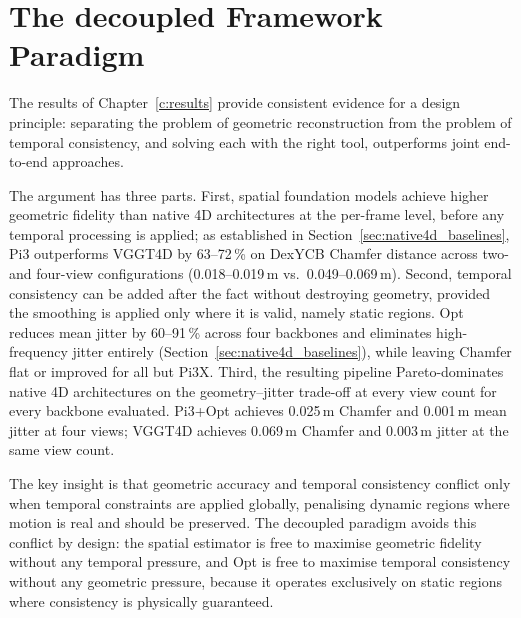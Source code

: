 \section{The decoupled Framework Paradigm}
\label{sec:decoupled_paradigm}

The results of Chapter~\ref{c:results} provide consistent evidence for a design
principle: separating the problem of geometric reconstruction from the problem of
temporal consistency, and solving each with the right tool, outperforms joint
end-to-end approaches.

The argument has three parts. First, spatial foundation models achieve higher geometric
fidelity than native 4D architectures at the per-frame level, before any temporal
processing is applied; as established in Section~\ref{sec:native4d_baselines}, Pi3
outperforms VGGT4D by 63--72\,\% on DexYCB Chamfer distance across two- and four-view
configurations (0.018--0.019\,m vs.\ 0.049--0.069\,m). Second, temporal consistency can be added after the
fact without destroying geometry, provided the smoothing is applied only where it is
valid, namely static regions. Opt reduces mean jitter by 60--91\,\% across four backbones and eliminates
high-frequency jitter entirely (Section~\ref{sec:native4d_baselines}), while leaving
Chamfer flat or improved for all but Pi3X. Third, the
resulting pipeline Pareto-dominates native 4D architectures on the geometry--jitter
trade-off at every view count for every backbone evaluated. Pi3+Opt achieves 0.025\,m
Chamfer and 0.001\,m mean jitter at four views; VGGT4D achieves 0.069\,m Chamfer and
0.003\,m jitter at the same view count.

The key insight is that geometric accuracy and temporal consistency conflict only when
temporal constraints are applied globally, penalising dynamic regions where motion is
real and should be preserved. The decoupled paradigm avoids this conflict by design:
the spatial estimator is free to maximise geometric fidelity without any temporal
pressure, and Opt is free to maximise temporal consistency without any geometric
pressure, because it operates exclusively on static regions where consistency is
physically guaranteed.

